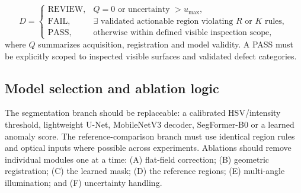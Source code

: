 \begin{equation}
D=\begin{cases}
\mathrm{REVIEW}, & Q=0 \text{ or uncertainty $>u_{\max}$},\\
\mathrm{FAIL}, & \exists\text{ validated actionable region violating $R$ or $K$ rules},\\
\mathrm{PASS}, & \text{otherwise within defined visible inspection scope},
\end{cases}
\end{equation}
where $Q$ summarizes acquisition, registration and model validity. A PASS must be explicitly scoped to inspected visible surfaces and validated defect categories.

\subsection{Model selection and ablation logic}
The segmentation branch should be replaceable: a calibrated HSV/intensity threshold, lightweight U-Net, MobileNetV3 decoder, SegFormer-B0 or a learned anomaly score. The reference-comparison branch must use identical region rules and optical inputs where possible across experiments. Ablations should remove individual modules one at a time: (A) flat-field correction; (B) geometric registration; (C) the learned mask; (D) the reference regions; (E) multi-angle illumination; and (F) uncertainty handling.
